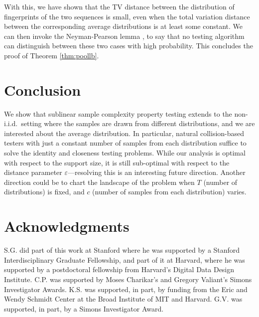 \documentclass[10pt]{article} %
\def\eps{{\varepsilon}}
\theoremstyle{plain}
\begin{document}
With this, we have shown that the TV distance between the distribution of fingerprints of the two sequences is small, even when the total variation distance between the corresponding average distributions is at least some constant. We can then invoke the Neyman-Pearson lemma \citep{neyman1933ix}, \citep[Lemma 1.4]{clement-tb} to say that no testing algorithm can distinguish between these two cases  with high probability. This concludes the proof of Theorem \ref{thm:poollb}.






	
	
	
	
	
	
	
	
	
	
	
	
	
	
	
	
	
	
	
	
	
	
	
	
	

\section{Conclusion}
\label{sec:conclusion}

We show that sublinear sample complexity property testing extends to the non-i.i.d.\ setting where the samples are drawn from different distributions, and we are interested about the average distribution. In particular, natural collision-based testers with just a constant number of samples from each distribution suffice to solve the identity and closeness testing problems. While our analysis is optimal with respect to the support size, it is still sub-optimal with respect to the distance parameter $\eps$---resolving this is an interesting future direction. Another direction could be to chart the landscape of the problem when $T$ (number of distributions) is fixed, and $c$ (number of samples from each distribution) varies. %



\section*{Acknowledgments}
S.G. did part of this work at Stanford where he was supported by a Stanford
Interdisciplinary Graduate Fellowship, and part of it at Harvard, where he was supported by a postdoctoral fellowship from Harvard's Digital Data Design Institute. C.P. was supported by Moses Charikar's and Gregory Valiant's Simons Investigator Awards. K.S. was supported, in part, by funding from the Eric and Wendy Schmidt Center at the Broad Institute of MIT and Harvard. G.V. was supported, in part, by a Simons Investigator Award.
\end{document}
